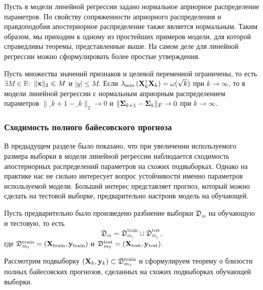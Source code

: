 Пусть в модели линейной регрессии задано нормальное априорное распределение параметров. По свойству сопряженности априорного распределения и правдоподобия апостериорное распределение также является нормальным. Таким образом, мы приходим к одному из простейших примеров модели, для которой справедливы теоремы, представленные выше. На самом деле для линейной регрессии можно сформулировать более простые утверждения.

\begin{theorem}[Киселев, 2024]\label{theorem4}
    Пусть множества значений признаков и целевой переменной ограничены, то есть $\exists M \in \mathbb{R}:$ $\| \mathbf{x} \|_2 \leqslant M$ и $|y| \leqslant M$. Если  $\lambda_{\min}\left( \mathbf{X}^{\text{\tiny\sffamily\upshape\mdseries T}}_k \mathbf{X}_k \right) = \omega(\sqrt{k})$ при $k \to \infty$, то в модели линейной регрессии с нормальным априорным распределением параметров $\| \bm_{k+1} - \bm_k \|_2 \to 0$ и  $\| \boldsymbol{\Sigma}_{k+1} - \boldsymbol{\Sigma}_k \|_{F} \to 0$ при $k \to \infty$.
\end{theorem}

\subsubsection{Сходимость полного байесовского прогноза}

В предыдущем разделе было показано, что при увеличении используемого размера выборки в модели линейной регрессии наблюдается сходимость апостериорных распределений параметров на схожих подвыборках. Однако на практике нас не сильно интересует вопрос устойчивости именно параметров используемой модели. Больший интерес представляет прогноз, который можно сделать на тестовой выборке, предварительно настроив модель на обучающей.

Пусть предварительно было произведено разбиение выборки $\mathfrak{D}_m$ на обучающую и тестовую, то есть
\[ \mathfrak{D}_m = \mathfrak{D}_{m_1}^{\text{train}} \sqcup \mathfrak{D}_{m_2}^{\text{test}}, \]
где $\mathfrak{D}_{m_1}^{\text{train}} = \left( \mathbf{X}_{\text{train}}, \mathbf{y}_{\text{train}} \right)$ и $\mathfrak{D}_{m_2}^{\text{test}} = \left( \mathbf{X}_{\text{test}}, \mathbf{y}_{\text{test}} \right)$.

Рассмотрим подвыборку $\left( \mathbf{X}_k, \mathbf{y}_k \right) \subset \mathfrak{D}_{m_1}^{\text{train}}$ и сформулируем теорему о близости полных байесовских прогнозов, сделанных на схожих подвыборках обучающей выборки.

